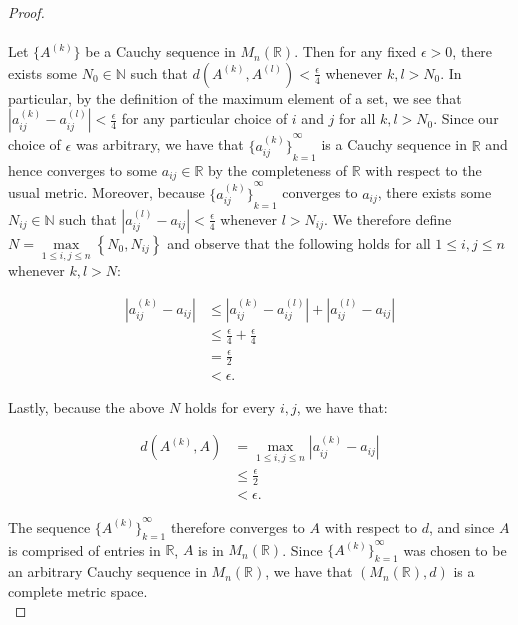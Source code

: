     \begin{proof}\ \\\\
        Let $\{A^{(k)}\}$ be a Cauchy sequence in $M_n(\mathbb{R})$. Then for any fixed $\epsilon > 0$, there exists
        some $N_0 \in \mathbb{N}$ such that $d(A^{(k)}, A^{(l)}) < \frac{\epsilon}{4}$ whenever $k,l > N_0$. In 
        particular, by the definition of the maximum element of a set, we see that 
        $|a_{ij}^{(k)} - a_{ij}^{(l)}| < \frac{\epsilon}{4}$ for any particular choice of $i$ and $j$ for all 
        $k,l > N_0$. Since our choice of $\epsilon$ was arbitrary, we have that ${\{a_{ij}^{(k)}\}}_{k=1}^{\infty}$ is a
        Cauchy sequence in $\mathbb{R}$ and hence converges to some $a_{ij} \in \mathbb{R}$ by the completeness of 
        $\mathbb{R}$ with respect to the usual metric. Moreover, because ${\{a_{ij}^{(k)}\}}_{k=1}^{\infty}$ converges 
        to $a_{ij}$, there exists some $N_{ij} \in \mathbb{N}$ such that $|a_{ij}^{(l)} - a_{ij}| < \frac{\epsilon}{4}$ 
        whenever $l > N_{ij}$. We therefore define $N = \max\limits_{1 \le i, j \le n}{\left\{N_0, N_{ij}\right\}}$ and
        observe that the following holds for all $1 \le i, j \le n$ whenever $k, l > N$:

        \begin{align*}
            |a_{ij}^{(k)} - a_{ij}| &\le |a_{ij}^{(k)} - a_{ij}^{(l)}| + |a_{ij}^{(l)} - a_{ij}| \\
                                    &\le \frac{\epsilon}{4} + \frac{\epsilon}{4} \\
                                    &= \frac{\epsilon}{2} \\
                                    &< \epsilon.
        \end{align*}

        Lastly, because the above $N$ holds for every $i, j$, we have that:
        
        \begin{align*}
            d(A^{(k)}, A) &= \max\limits_{1 \le i,j \le n}{|a_{ij}^{(k)} - a_{ij}|} \\
                          &\le \frac{\epsilon}{2} \\
                          &< \epsilon.
        \end{align*}

        The sequence ${\{A^{(k)}\}}_{k=1}^{\infty}$ therefore converges to $A$ with respect to $d$, and since $A$
        is comprised of entries in $\mathbb{R}$, $A$ is in $M_n(\mathbb{R})$. Since ${\{A^{(k)}\}}_{k=1}^{\infty}$ was 
        chosen to be an arbitrary Cauchy sequence in $M_n(\mathbb{R})$, we have that $(M_n(\mathbb{R}), d)$ is a 
        complete metric space.
        \ \\
    \end{proof}

    \pagebreak